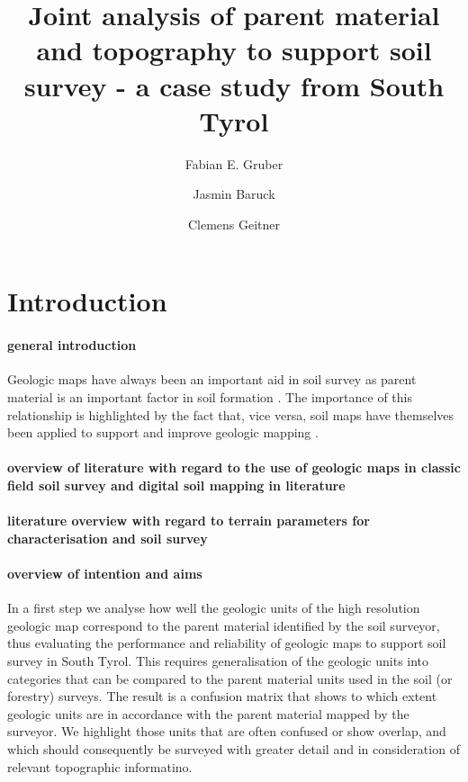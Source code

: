 \documentclass[preprint,12pt,authoryear]{elsarticle}
\begin{document}
\begin{frontmatter}

\title{Joint analysis of parent material and topography to support soil survey - a case study from South Tyrol}


\author{Fabian E. Gruber}
\author{Jasmin Baruck}
\author{Clemens Geitner}

\address{University of Innsbruck}

\begin{abstract}

\end{abstract}

\begin{keyword}

\end{keyword}

\end{frontmatter}

\linenumbers

\section{Introduction}
\paragraph{general introduction}
Geologic maps have always been an important aid in soil survey as parent material is an important factor in soil formation \citep{Jenny1941}. The importance of this relationship is highlighted by the fact that, vice versa, soil maps have themselves been applied to support and improve geologic mapping \citep{Brevik2015}. 

\paragraph{overview of literature with regard to the use of geologic maps in classic field soil survey and digital soil mapping in literature}
\paragraph{literature overview with regard to terrain parameters for characterisation and soil survey}
\paragraph{overview of intention and aims}
In a first step we analyse how well the geologic units of the high resolution geologic map correspond to the parent material identified by the soil surveyor, thus evaluating the performance and reliability of geologic maps to support soil survey in South Tyrol. This requires generalisation of the geologic units into categories that can be compared to the parent material units used in the soil (or forestry) surveys. The result is a confusion matrix that shows to which extent geologic units are in accordance with the parent material mapped by the surveyor.  We highlight those units that are often confused or show overlap, and which should consequently be surveyed with greater detail and in consideration of relevant topographic informatino.
\end{document}
